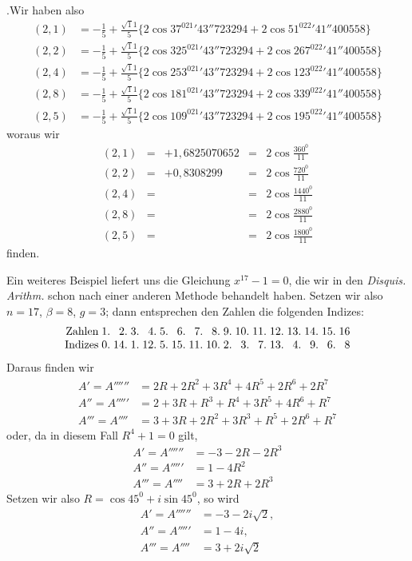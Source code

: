 .Wir haben also
\[
\begin{aligned}
(2,1)&=-\frac15+\frac{\surd11}5\{2\cos37^021'43''723294+2\cos51^022'41''400558\}\\
(2,2)&=-\frac15+\frac{\surd11}5\{2\cos325^021'43''723294+2\cos267^022'41''400558\}\\
(2,4)&=-\frac15+\frac{\surd11}5\{2\cos253^021'43''723294+2\cos123^022'41''400558\}\\
(2,8)&=-\frac15+\frac{\surd11}5\{2\cos181^021'43''723294+2\cos339^022'41''400558\}\\
(2,5)&=-\frac15+\frac{\surd11}5\{2\cos109^021'43''723294+2\cos195^022'41''400558\}
\end{aligned}
\]
woraus wir
\[
\begin{array}{rclcl}
(2,1)&=&+1{,}6825070652&=&2\cos\frac{360^0}{11}\\[3pt]
(2,2)&=&+0{,}8308299&=&2\cos\frac{720^0}{11}\\[3pt]
(2,4)&=&&=&2\cos\frac{1440^0}{11}\\[3pt]
(2,8)&=&&=&2\cos\frac{2880^0}{11}\\[3pt]
(2,5)&=&&=&2\cos\frac{1800^0}{11}
\end{array}
\]
finden.

\begingroup
\setlength{\abovedisplayskip}{8pt plus 2pt minus 2pt}
\setlength{\belowdisplayskip}{8pt plus 2pt minus 2pt}
Ein weiteres Beispiel liefert uns die Gleichung $x^{17}-1=0$, die wir in den \emph{Disquis. Arithm.} schon nach einer anderen Methode behandelt haben. Setzen wir also $n=17$, $\beta=8$, $g=3$; dann entsprechen den Zahlen die folgenden Indizes:
\[
\begin{array}{r*{16}{@{\;}r}}
\text{Zahlen}&1\pdot&2\pdot&3\pdot&4\pdot&5\pdot&6\pdot&7\pdot&8\pdot&9\pdot&10\pdot&11\pdot&12\pdot&13\pdot&14\pdot&15\pdot&16\\
\text{Indizes}&0\pdot&14\pdot&1\pdot&12\pdot&5\pdot&15\pdot&11\pdot&10\pdot&2\pdot&3\pdot&7\pdot&13\pdot&4\pdot&9\pdot&6\pdot&8
\end{array}
\]
Daraus finden wir
\[
\begin{aligned}
A'=A''''''&=2R+2R^2+3R^4+4R^5+2R^6+2R^7\\
A''=A'''''&=2+3R+R^3+R^4+3R^5+4R^6+R^7\\
A'''=A''''&=3+3R+2R^2+3R^3+R^5+2R^6+R^7
\end{aligned}
\]
oder, da in diesem Fall $R^4+1=0$ gilt,
\[
\begin{aligned}
A'=A''''''&=-3-2R-2R^3\\
A''=A'''''&=1-4R^2\\
A'''=A''''&=3+2R+2R^3
\end{aligned}
\]
Setzen wir also $R=\cos45^0+i\sin45^0$, so wird
\[
\begin{aligned}
A'=A''''''&=-3-2i\surd2,\\
A''=A'''''&=1-4i,\\
A'''=A''''&=3+2i\surd2
\end{aligned}
\]

